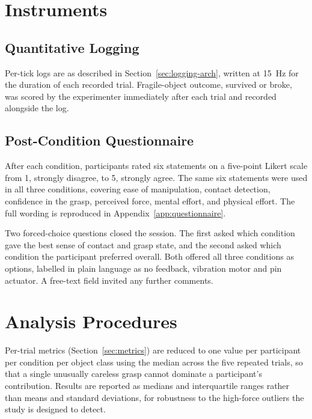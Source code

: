 \documentclass[12pt, a4paper, twoside, openright]{report}
\begin{document}
\section{Instruments}
\label{sec:instruments}

\subsection{Quantitative Logging}
\label{subsec:logging}

Per-tick logs are as described in Section~\ref{sec:logging-arch}, written at
\SI{15}{\hertz} for the duration of each recorded trial. Fragile-object
outcome, survived or broke, was scored by the experimenter immediately after
each trial and recorded alongside the log.

\subsection{Post-Condition Questionnaire}
\label{subsec:questionnaire}

After each condition, participants rated six statements on a five-point Likert
scale from 1, strongly disagree, to 5, strongly agree. The same six statements
were used in all three conditions, covering ease of manipulation, contact
detection, confidence in the grasp, perceived force, mental effort, and
physical effort. The full wording is reproduced in
Appendix~\ref{app:questionnaire}.

Two forced-choice questions closed the session. The first asked which condition
gave the best sense of contact and grasp state, and the second asked which
condition the participant preferred overall. Both offered all three conditions
as options, labelled in plain language as no feedback, vibration motor and pin
actuator. A free-text field invited any further comments.

\section{Analysis Procedures}
\label{sec:analysis-procedures}

Per-trial metrics (Section~\ref{sec:metrics}) are reduced to one value per
participant per condition per object class using the median across the five
repeated trials, so that a single unusually careless grasp cannot dominate a
participant's contribution. Results are reported as medians and interquartile
ranges rather than means and standard deviations, for robustness to the
high-force outliers the study is designed to detect.
\end{document}
